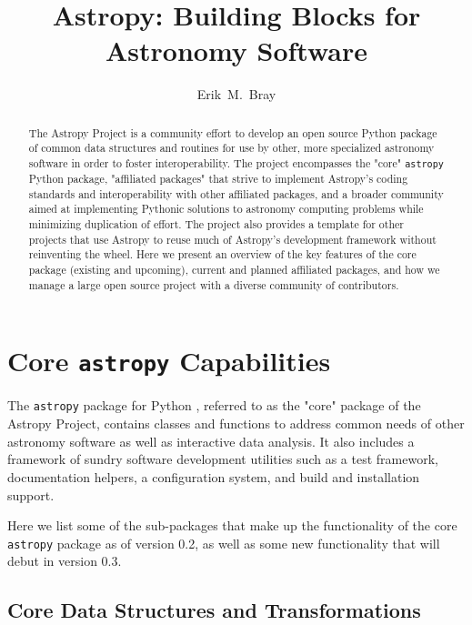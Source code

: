 \documentclass[11pt,twoside]{article}
\begin{document}
\title{Astropy: Building Blocks for Astronomy Software}

\author{Erik~M.~Bray
}

\begin{abstract}
The Astropy Project is a community effort to develop an open source Python
package of common data structures and routines for use by other, more
specialized astronomy software in order to foster interoperability.
The project encompasses the "core" \texttt{astropy} Python package, "affiliated
packages" that strive to implement Astropy's coding standards and
interoperability with other affiliated packages, and a broader community aimed
at implementing Pythonic solutions to astronomy computing problems while
minimizing duplication of effort.  The project also provides a template for
other projects that use Astropy to reuse much of Astropy's development
framework without reinventing the wheel.
Here we present an overview of the key features of the core package (existing
and upcoming), current and planned affiliated packages, and how we manage a
large open source project with a diverse community of contributors.
\end{abstract}

\section{Core \texttt{astropy} Capabilities}

The \texttt{astropy} package for Python \citep{2013arXiv1307.6212T}, referred
to as the "core" package of the Astropy Project, contains classes and functions
to address common needs of other astronomy software as well as interactive data
analysis.  It also includes a framework of sundry software development
utilities such as a test framework, documentation helpers, a configuration
system, and build and installation support.

Here we list some of the sub-packages that make up the functionality of the
core \texttt{astropy} package as of version 0.2, as well as some new
functionality that will debut in version 0.3.

\subsection{Core Data Structures and Transformations}

\end{document}
